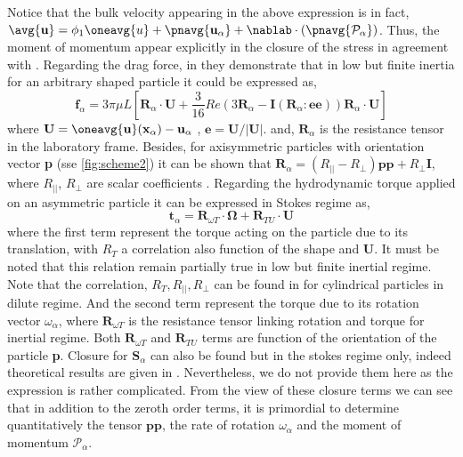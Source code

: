 Notice that the bulk velocity appearing in the above expression is in fact, $\avg{\textbf{u}} = \phi_1\oneavg{u} + \pnavg{\textbf{u}_\alpha} + \nablab\cdot (\pnavg{\mathcal{P}_\alpha})$.
Thus, the moment of momentum appear explicitly in the closure of the stress in agreement with \citet{zhang1997momentum}.  
Regarding the drag force, in  \citet{brenner1963resistance} they demonstrate that in low but finite inertia for an arbitrary shaped particle it could be expressed as,
\begin{equation}
    \textbf{f}_\alpha = 3 \pi \mu L \left[
        \textbf{R}_\alpha \cdot \textbf{U}
        + \frac{3}{16} Re  \left(
            3 \textbf{R}_\alpha 
            - \textbf{I} (\textbf{R}_\alpha : \textbf{e} \textbf{e})
        \right)
        \textbf{R}_\alpha\cdot  \textbf{U}
    \right]
\end{equation}
where $\textbf{U} = \oneavg{\textbf{u}}(\textbf{x}_\alpha)  - \textbf{u}_\alpha$ , $\textbf{e} = \textbf{U}/|\textbf{U}|$. 
and,  $\textbf{R}_\alpha$ is the resistance tensor in the laboratory frame. 
Besides, for axisymmetric particles with orientation vector \textbf{p} (sse \ref{fig:scheme2}) it can be shown that $\textbf{R}_\alpha = (R_{||} - R_\bot) \textbf{pp} + R_\bot \textbf{I}$, where $R_{||}$, $R_\bot$ are scalar coefficients \citep{guazzelli2011,kim2013microhydrodynamics}. 
Regarding the hydrodynamic torque applied on an asymmetric particle it can be expressed in Stokes regime as, 
\begin{equation}
    \textbf{t}_\alpha 
    = 
    \textbf{R}_{\omega T}\cdot \mathbf{\Omega}
     + \textbf{R}_{TU} \cdot \textbf{U} 
\end{equation}
where the first term represent the torque acting on the particle due to its translation,
with $R_T$ a correlation also function of the shape and $\textbf{U}$.
It must be noted that this relation remain partially true in low but finite inertial regime. 
Note that the correlation,  $R_T, R_{||} , R_{\bot}$ can be found in \citet{fintzi2023inertial} for cylindrical particles in dilute regime. 
And the second term represent the torque due to its rotation vector $\omega_\alpha$, where $\textbf{R}_{\omega T}$ is the resistance tensor linking rotation and torque \citet{pierson2021hydrodynamic} for inertial regime.  
Both $\textbf{R}_{\omega T}$ and $\textbf{R}_{TU}$ terms are function of the orientation of the particle \textbf{p}.
Closure for $\textbf{S}_\alpha$ can also be found but in the stokes regime only, 
indeed theoretical results are given in \citet[p 62]{kim2013microhydrodynamics}. Nevertheless, we do not provide them here as the expression is rather complicated. 
From the view of these closure terms we can see that in addition to the zeroth order terms, it is primordial to determine quantitatively the tensor $\textbf{pp}$, the rate of rotation $\omega_\alpha$ and the moment of momentum $\mathcal{P}_\alpha$. 

